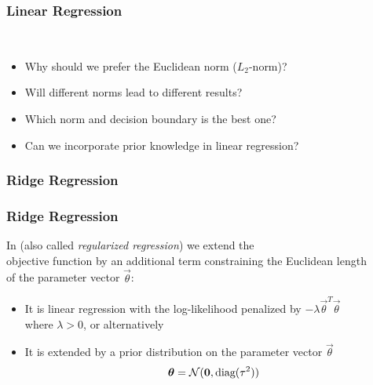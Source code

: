 \begin{frame}
	\frametitle{Linear Regression \cont}

	 \\[.5cm]

	\begin{itemize}
		\item Why should we prefer the Euclidean norm ($L_2$-norm)? \\[.5cm]
		\item Will different norms lead to different results? \\[.5cm]
		\item Which norm and decision boundary is the best one? \\[.5cm]
		\item Can we incorporate prior knowledge in linear regression?
	\end{itemize}
\end{frame}


\subsubsection{Ridge Regression}

\begin{frame}
	\frametitle{Ridge Regression}

	In  (also called \emph{regularized regression}) we extend the \\
	objective function by an additional term constraining the Euclidean length \\
	of the parameter vector $\vec{\theta}$:

	\begin{itemize}
		\item It is linear regression with the log-likelihood penalized by $-\lambda\vec \theta^T \vec \theta$ \\
		      where $\lambda > 0$, or alternatively \\[.5cm]
		\item It is extended by a prior distribution on the parameter vector $\vec\theta$
		      \begin{displaymath}
			      \vec \theta = {\cal N}(\vec 0,\mbox{diag}( \tau^2) )
		      \end{displaymath}
	\end{itemize}
\end{frame}



